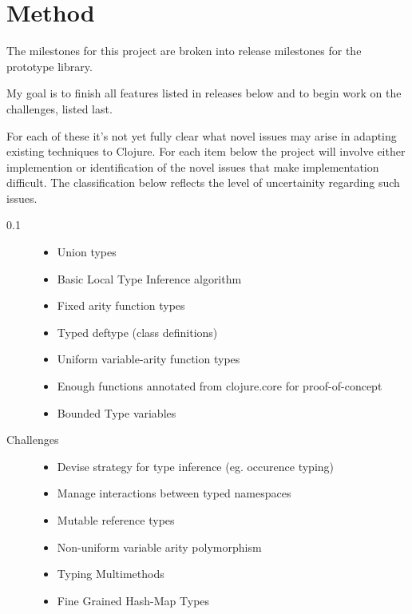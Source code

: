 \documentclass[12pt, a4paper]{article}
\begin{document}
\section*{Method}


The milestones for this project are broken into release milestones
for the prototype library.

My goal is to finish all features listed in releases below
and to begin work on the challenges, listed last.

For each of these it's not yet fully clear what novel issues may 
arise in adapting existing techniques to Clojure.  For each item 
below the project will involve either implemention or identification 
of the novel issues that make implementation difficult.  
The classification below reflects the level of uncertainity 
regarding such issues.

\begin{description}
\item[0.1]
	\begin{itemize}
	\item Union types
  \item Basic Local Type Inference algorithm
	\item Fixed arity function types
	\item Typed deftype (class definitions)
	\item Uniform variable-arity function types
	\item Enough functions annotated from clojure.core for proof-of-concept
	\item Bounded Type variables
	\end{itemize}
\item[Challenges]
	\begin{itemize}
	\item Devise strategy for type inference (eg. occurence typing)
	\item Manage interactions between typed namespaces
	\item Mutable reference types
	\item Non-uniform variable arity polymorphism
	\item Typing Multimethods
	\item Fine Grained Hash-Map Types
	\end{itemize}

\end{description}
\end{document}
